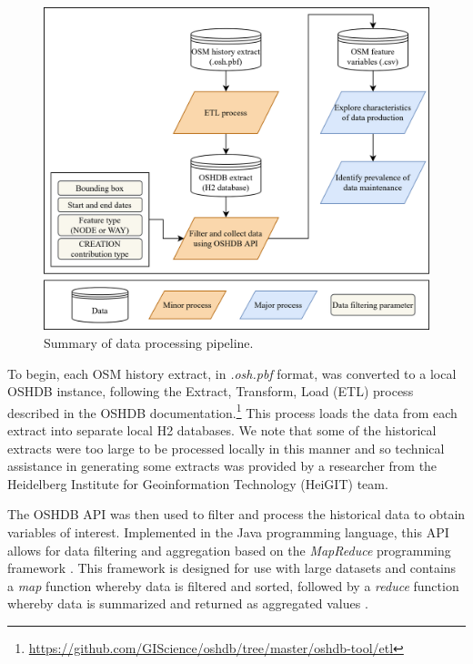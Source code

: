 \begin{figure} %
    \centering %
    \includegraphics[width = \textwidth]{Images/Datapipeline.png} %
    \caption{Summary of data processing pipeline.} %
    \label{fig:pipe} %
\end{figure}

To begin, each OSM history extract, in \textit{.osh.pbf} format, was converted to a local OSHDB instance, following the Extract, Transform, Load (ETL) process described in the OSHDB documentation.\footnote{\url{https://github.com/GIScience/oshdb/tree/master/oshdb-tool/etl}} This process loads the data from each extract into separate local H2 databases. We note that some of the historical extracts were too large to be processed locally in this manner and so technical assistance in generating some extracts was provided by a researcher from the Heidelberg Institute for Geoinformation Technology (HeiGIT) team. 

The OSHDB API \parencite{raifer_oshdb_2019} was then used to filter and process the historical data to obtain variables of interest.  Implemented in the Java programming language, this API allows for data filtering and aggregation based on the \textit{MapReduce} programming framework \parencite{raifer_oshdb_2019}. This framework is designed for use with large datasets and contains a \textit{map} function whereby data is filtered and sorted, followed by a \textit{reduce} function whereby data is summarized and returned as aggregated values \parencite{dean_mapreduce_2008}.

